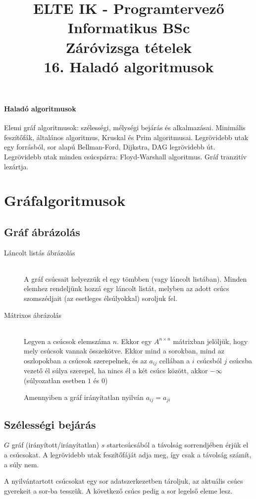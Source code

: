 \documentclass[margin=0px]{article}
\title{\textbf{{\Large ELTE IK - Programtervező Informatikus BSc} \vspace{0.2cm} \\ {\huge Záróvizsga tételek}} \vspace{0.3cm} \\ 16. Haladó algoritmusok}
\author{}
\date{}
\newenvironment{tetel}[1]{\paragraph{#1 \\}}{}
\begin{document}
\maketitle

\begin{tetel}{Haladó algoritmusok}
    Elemi gráf algoritmusok: szélességi, mélységi bejárás és alkalmazásai. Minimális feszítőfák, általános algoritmus, Kruskal és Prim algoritmusai. Legrövidebb utak egy forrásból, sor alapú Bellman-Ford, Dijkstra, DAG legrövidebb út. Legrövidebb utak minden csúcspárra: Floyd-Warshall algoritmus. Gráf tranzitív lezártja.
\end{tetel}

\section{Gráfalgoritmusok}
\subsection{Gráf ábrázolás}
\begin{description}
    \item[Láncolt listás ábrázolás] \hfill \\
        A gráf csúcsait helyezzük el egy tömbben (vagy láncolt listában). Minden elemhez rendeljünk hozzá egy láncolt listát, melyben az adott csúcs szomszédjait (az esetleges élsúlyokkal) soroljuk fel.
    \item[Mátrixos ábrázolás] \hfill \\
        Legyen a csúcsok elemszáma $n$. Ekkor egy $A^{n\times n}$ mátrixban jelöljük, hogy mely csúcsok vannak összekötve. Ekkor mind a sorokban, mind az oszlopokban a csúcsok szerepelnek, és az $a_{ij}$ cellában a $i$ csúcsból $j$ csúcsba vezető él súlya szerepel, ha nincs él a két csúcs között, akkor $-\infty$ (súlyozatlan esetben $1$ és $0$)

        Amennyiben a gráf irányítatlan nyilván $a_{ij} = a_{ji}$
\end{description}
\subsection{Szélességi bejárás}
$G$ gráf (irányított/irányítatlan) $s$ startcsúcsából a távolság sorrendjében érjük el a csúcsokat. A legrövidebb utak feszítőfáját adja meg, így csak a távolság számít, a súly nem.

A nyilvántartott csúcsokat egy sor adatszerkezetben tároljuk, az aktuális csúcs gyerekeit a sor-ba tesszük. A következő csúcs pedig a sor legelső eleme lesz.
\end{document}
